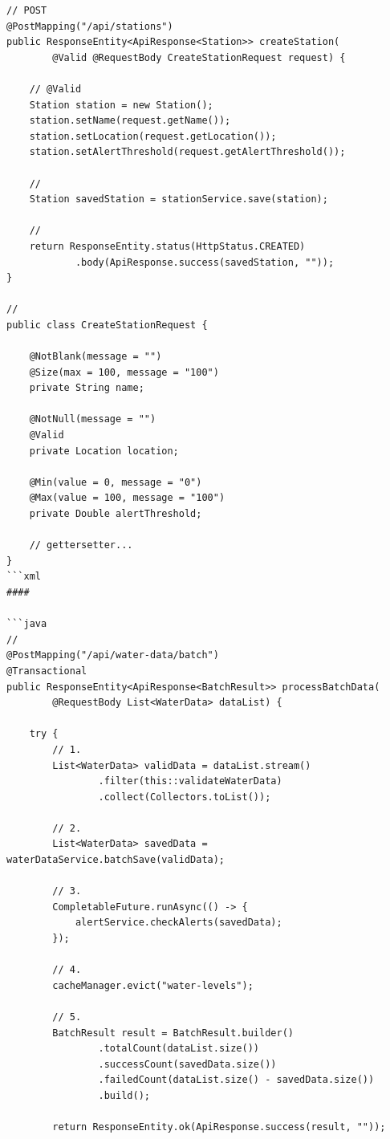\begin{verbatim}
// POST
@PostMapping("/api/stations")
public ResponseEntity<ApiResponse<Station>> createStation(
        @Valid @RequestBody CreateStationRequest request) {
    
    // @Valid
    Station station = new Station();
    station.setName(request.getName());
    station.setLocation(request.getLocation());
    station.setAlertThreshold(request.getAlertThreshold());
    
    // 
    Station savedStation = stationService.save(station);
    
    // 
    return ResponseEntity.status(HttpStatus.CREATED)
            .body(ApiResponse.success(savedStation, ""));
}

// 
public class CreateStationRequest {
    
    @NotBlank(message = "")
    @Size(max = 100, message = "100")
    private String name;
    
    @NotNull(message = "")
    @Valid
    private Location location;
    
    @Min(value = 0, message = "0")
    @Max(value = 100, message = "100")
    private Double alertThreshold;
    
    // gettersetter...
}
```xml
#### 

```java
// 
@PostMapping("/api/water-data/batch")
@Transactional
public ResponseEntity<ApiResponse<BatchResult>> processBatchData(
        @RequestBody List<WaterData> dataList) {
    
    try {
        // 1. 
        List<WaterData> validData = dataList.stream()
                .filter(this::validateWaterData)
                .collect(Collectors.toList());
        
        // 2. 
        List<WaterData> savedData = waterDataService.batchSave(validData);
        
        // 3. 
        CompletableFuture.runAsync(() -> {
            alertService.checkAlerts(savedData);
        });
        
        // 4. 
        cacheManager.evict("water-levels");
        
        // 5. 
        BatchResult result = BatchResult.builder()
                .totalCount(dataList.size())
                .successCount(savedData.size())
                .failedCount(dataList.size() - savedData.size())
                .build();
        
        return ResponseEntity.ok(ApiResponse.success(result, ""));
        

\end{verbatim}
